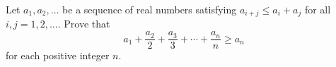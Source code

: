 Let $a_1, a_2, \dots$ be a sequence of real numbers satisfying $a_{i+j} \leq a_i+a_j$ for all $i,j=1,2,\dots$. Prove that \[ a_1 + \frac{a_2}{2} + \frac{a_3}{3} + \cdots + \frac{a_n}{n} \geq a_n  \] for each positive integer $n$.